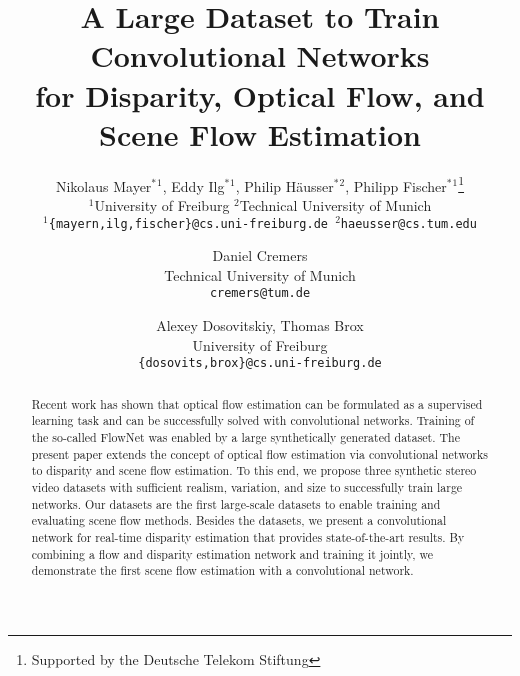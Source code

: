 \documentclass[10pt,twocolumn,letterpaper]{article}
\begin{document}
\title{A Large Dataset to Train Convolutional Networks\\[1mm] for Disparity, Optical Flow, and Scene Flow Estimation}

\renewcommand*{\thefootnote}{\fnsymbol{footnote}}

\author{
  Nikolaus Mayer$^*$$^1$,
  Eddy Ilg$^*$$^1$,
  Philip H{\"a}usser$^*$$^2$,
  Philipp Fischer$^*$$^1$\footnote{Supported by the Deutsche Telekom Stiftung}\\
  $^1$University of Freiburg \hspace*{1cm} $^2$Technical University of Munich\\
  {\tt\small $^1$\{mayern,ilg,fischer\}@cs.uni-freiburg.de \hspace{.5cm} $^2$haeusser@cs.tum.edu}
\and
  Daniel Cremers\\
  Technical University of Munich\\
  {\tt\small cremers@tum.de}
\and
  Alexey Dosovitskiy, 
  Thomas Brox\\
  University of Freiburg\\
  {\tt\small \{dosovits,brox\}@cs.uni-freiburg.de}
}


\maketitle



\renewcommand*{\thefootnote}{\arabic{footnote}}

\begin{abstract}
Recent work has shown that optical flow estimation can be formulated as a supervised learning task and can be successfully solved with convolutional networks. 
Training of the so-called FlowNet was enabled by a large synthetically generated dataset. The present paper extends the concept of optical flow estimation via convolutional networks to disparity and scene flow estimation. 
To this end, we propose three synthetic stereo video datasets with sufficient realism, variation, and size to successfully train large networks. 
Our datasets are the first large-scale datasets to enable training and evaluating scene flow methods. 
Besides the datasets, we present a convolutional network for real-time disparity estimation that provides state-of-the-art results. By combining a flow and disparity estimation network and training it jointly, we demonstrate the first scene flow estimation with a convolutional network. 
\end{abstract}
\end{document}
